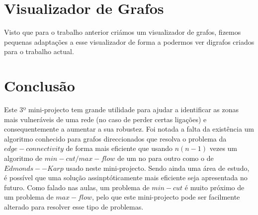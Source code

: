 \documentclass[10pt,a4paper]{article}
\begin{document}
\section{Visualizador de Grafos}
Visto que para o trabalho anterior criámos um visualizador de grafos, fizemos pequenas adaptações a esse visualizador de forma a podermos ver digrafos criados para o trabalho actual.

\section{Conclusão}
Este 3º mini-projecto tem grande utilidade para ajudar a identificar as zonas mais vulneráveis de uma rede (no caso de perder certas ligações) e consequentemente a aumentar a sua robustez. Foi notada a falta da existência um algoritmo conhecido para grafos direccionados que resolva o problema da $edge-connectivity$ de forma mais eficiente que usando $n(n-1)$ vezes um algoritmo de $min-cut/max-flow$  de um no para outro como o de $Edmonds--Karp$ usado neste mini-projecto. Sendo ainda uma área de estudo, é possível que uma solução assinptóticamente mais eficiente seja apresentada no futuro.  Como falado nas aulas, um problema de $min-cut$ é muito próximo de um problema de $max-flow$, pelo que este mini-projecto pode ser facilmente alterado para resolver esse tipo de problemas.



\nocite{slidesADRC}
\end{document}
